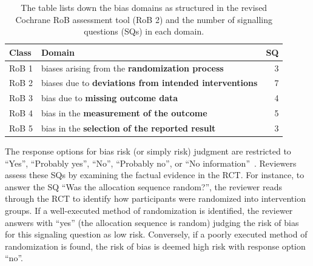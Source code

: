 \documentclass[sn-mathphys,Numbered]{sn-jnl}%
\theoremstyle{thmstyleone}%
\theoremstyle{thmstyletwo}%
\theoremstyle{thmstylethree}%
\begin{document}
%
%
%
\begin{table}
 \centering
   \caption{The table lists down the bias domains as structured in the revised Cochrane RoB assessment tool (RoB 2) and the number of signalling questions (SQs) in each domain.}\label{tab:robdomains}
    \begin{tabular}{llr}
    \toprule[1.0pt]
     Class & Domain & SQ\\
    \midrule[1.0pt]
    RoB 1 & biases arising from the \textbf{randomization process} &  3\\
    RoB 2 & biases due to \textbf{deviations from intended interventions} & 7\\
    RoB 3 & bias due to \textbf{missing outcome data} & 4\\
    RoB 4 & bias in the \textbf{measurement of the outcome} & 5\\
    RoB 5 & bias in the \textbf{selection of the reported result} & 3\\
    \bottomrule[1.0pt]
    \end{tabular}
\end{table}
%
%
%


The response options for bias risk (or simply risk) judgment are restricted to ``Yes'', ``Probably yes'', ``No'', ``Probably no'', or ``No information''~\cite{sterne2019rob}.
Reviewers assess these SQs by examining the factual evidence in the RCT.
For instance, to answer the SQ ``Was the allocation sequence random?'', the reviewer reads through the RCT to identify how participants were randomized into intervention groups.
If a well-executed method of randomization is identified, the reviewer answers with ``yes'' (the allocation sequence is random) judging the risk of bias for this signaling question as low risk.
Conversely, if a poorly executed method of randomization is found, the risk of bias is deemed  high risk with response option ``no''.
\end{document}
